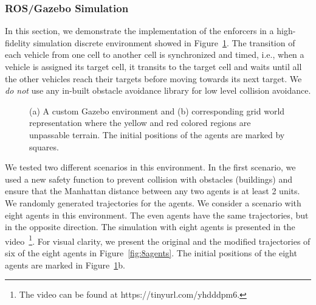 \subsubsection*{ROS/Gazebo Simulation}

In this section, we demonstrate the implementation of the enforcers in a high-fidelity simulation discrete environment showed in Figure~\ref{fig:sims}. The transition of each vehicle from one cell to another cell is synchronized and timed, i.e.,  when a vehicle is assigned its target cell, it transits to the target cell and waits until all the other vehicles reach their targets before moving towards its next target. 
We \emph{do not} use any in-built obstacle avoidance library for low level collision avoidance.

\begin{figure}[!htp]
\centering
{}
\caption{(a) A custom Gazebo environment and (b) corresponding grid world representation where the yellow and red colored regions are unpassable terrain. The initial positions of the agents are marked by squares. }
\label{fig:sims}
\end{figure}

We tested two different scenarios in this environment. In the first scenario, we used a new safety function to prevent collision with obstacles (buildings) and ensure that the Manhattan distance between any two agents is at least 2 units. We randomly generated trajectories for the agents. We consider a scenario with eight agents in this environment. The even agents have the same trajectories, but in the opposite direction. The simulation with eight agents is presented in the video~\footnote{ The video can be found at https://tinyurl.com/yhdddpm6.}. For visual clarity, we present the original and the modified trajectories of six of the eight agents in Figure~\ref{fig:8agents}. The initial positions of the eight agents are marked in Figure~\ref{fig:sims}b.

